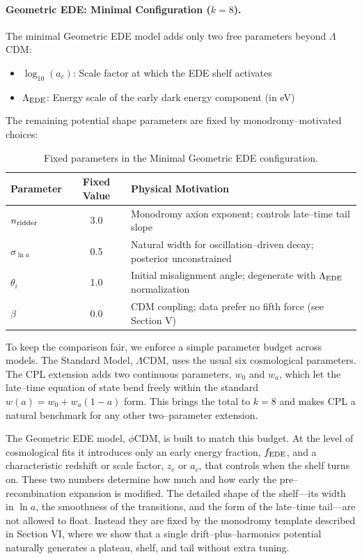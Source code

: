\documentclass[a4paper,11pt]{article}
\begin{document}
\paragraph{Geometric EDE: Minimal Configuration ($k = 8$).}
The minimal Geometric EDE model adds only two free parameters beyond $\Lambda$CDM:
\begin{itemize}
    \item $\log_{10}(a_c)$: Scale factor at which the EDE shelf activates
    \item $\Lambda_{\rm EDE}$: Energy scale of the early dark energy component (in eV)
\end{itemize}

The remaining potential shape parameters are fixed by monodromy--motivated choices:

\begin{table}[h]
\centering
\caption{Fixed parameters in the Minimal Geometric EDE configuration.}
\label{tab:fixed_params}
\begin{tabular}{lcl}
\toprule
Parameter & Fixed Value & Physical Motivation \\
\midrule
$n_{\rm ridder}$ & 3.0 & Monodromy axion exponent; controls late--time tail slope \\
$\sigma_{\ln a}$ & 0.5 & Natural width for oscillation--driven decay; posterior unconstrained \\
$\theta_i$ & 1.0 & Initial misalignment angle; degenerate with $\Lambda_{\rm EDE}$ normalization \\
$\beta$ & 0.0 & CDM coupling; data prefer no fifth force (see Section V) \\
\bottomrule
\end{tabular}
\end{table}

To keep the comparison fair, we enforce a simple parameter budget across models. The Standard Model, $\Lambda$CDM, uses the usual six cosmological parameters. The CPL extension adds two continuous parameters, $w_0$ and $w_a$, which let the late--time equation of state bend freely within the standard $w(a) = w_0 + w_a(1-a)$ form. This brings the total to $k = 8$ and makes CPL a natural benchmark for any other two--parameter extension.

The Geometric EDE model, $\phi$CDM, is built to match this budget. At the level of cosmological fits it introduces only an early energy fraction, $f_{\rm EDE}$, and a characteristic redshift or scale factor, $z_c$ or $a_c$, that controls when the shelf turns on. These two numbers determine how much and how early the pre--recombination expansion is modified. The detailed shape of the shelf---its width in $\ln a$, the smoothness of the transitions, and the form of the late--time tail---are not allowed to float. Instead they are fixed by the monodromy template described in Section VI, where we show that a single drift--plus--harmonics potential naturally generates a plateau, shelf, and tail without extra tuning.
\end{document}
